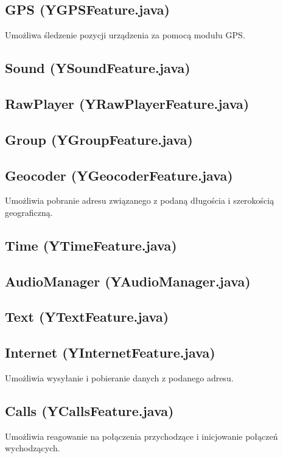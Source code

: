 \documentclass[11pt,a4paper,polish,thesis]{dcsbook}
\begin{document}
\subsection{GPS (YGPSFeature.java)}
Umożliwa śledzenie pozycji urządzenia za pomocą modułu GPS.

\subsection{Sound (YSoundFeature.java)}

\subsection{RawPlayer (YRawPlayerFeature.java)}

\subsection{Group (YGroupFeature.java)}

\subsection{Geocoder (YGeocoderFeature.java)}
Umożliwia pobranie adresu związanego z podaną długościa i szerokością geograficzną.

\subsection{Time (YTimeFeature.java)}

\subsection{AudioManager (YAudioManager.java)}

\subsection{Text (YTextFeature.java)}

\subsection{Internet (YInternetFeature.java)}
Umożliwia wysyłanie i pobieranie danych z podanego adresu.

\subsection{Calls (YCallsFeature.java)}
Umożliwia reagowanie na połączenia przychodzące i inicjowanie połączeń wychodzących.
\end{document}
